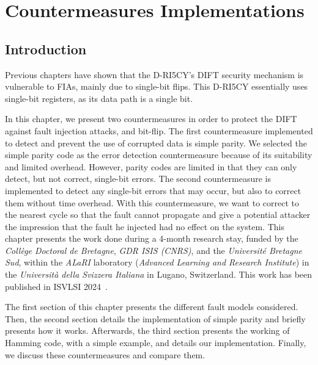 \chapter{Countermeasures Implementations}
\label{chapter:countermeasures}
\minitoc

\section{Introduction}
Previous chapters have shown that the D-RI5CY's DIFT security mechanism is vulnerable to FIAs, mainly due to single-bit flips. This D-RI5CY essentially uses single-bit registers, as its data path is a single bit.

In this chapter, we present two countermeasures in order to protect the DIFT against fault injection attacks, and bit-flip.
The first countermeasure implemented to detect and prevent the use of corrupted data is simple parity. We selected the simple parity code as the error detection countermeasure because of its suitability and limited overhead. However, parity codes are limited in that they can only detect, but not correct, single-bit errors.
The second countermeasure is implemented to detect any single-bit errors that may occur, but also to correct them without time overhead. With this countermeasure, we want to correct to the nearest cycle so that the fault cannot propagate and give a potential attacker the impression that the fault he injected had no effect on the system.
This chapter presents the work done during a 4-month research stay, funded by the \textit{Collège Doctoral de Bretagne}, \textit{GDR ISIS (CNRS)}, and the \textit{Université Bretagne Sud}, within the \textit{ALaRI} laboratory (\textit{Advanced Learning and Research Institute}) in the \textit{Università della Svizzera Italiana} in Lugano, Switzerland.
This work has been published in ISVLSI 2024~\cite{PRLG-24-isvlsi}.

The first section of this chapter presents the different fault models considered. Then, the second section details the implementation of simple parity and briefly presents how it works. Afterwards, the third section presents the working of Hamming code, with a simple example, and details our implementation. Finally, we discuss these countermeasures and compare them.

